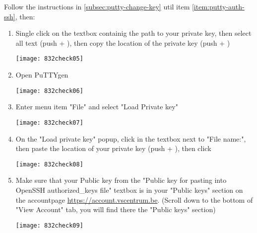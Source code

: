 Follow the instructions in \autoref{subsec:putty-change-key} util item \autoref{item:putty-auth-ssh}, then:
\begin{enumerate}
    \setcounter{enumi}{\value{puttyenum}}
    \item Single click on the textbox containig the path to your private key, then select all text
        (push  + ), then copy the location of the private key (push  + )

    \begin{center}
    \texttt{[image: 832check05]}
    \end{center}

    \item Open PuTTYgen

    \begin{center}
    \texttt{[image: 832check06]}
    \end{center}

    \item Enter menu item "File" and select "Load Private key"

    \begin{center}
    \texttt{[image: 832check07]}
    \end{center}

    \item On the "Load private key" popup, click in the textbox next to "File name:", then paste the location of
        your private key (push  + ), then click 

    \begin{center}
    \texttt{[image: 832check08]}
    \end{center}

    \item Make sure that your Public key from the "Public key for pasting into OpenSSH authorized\_keys file"
        textbox is in your "Public keys" section on the accountpage \url{https://account.vscentrum.be}.
        (Scroll down to the bottom of "View Account" tab, you will find there the "Public keys" section)

    \begin{center}
    \texttt{[image: 832check09]}
    \end{center}
\end{enumerate}

